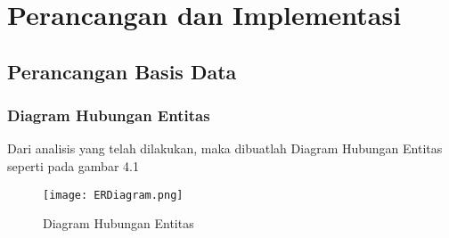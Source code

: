 \chapter{Perancangan dan Implementasi}
\label{chap:perancanganDanImplementasi}
\setcounter{secnumdepth}{3}
\section{Perancangan Basis Data}
\subsection{Diagram Hubungan Entitas}
Dari analisis yang telah dilakukan, maka dibuatlah Diagram Hubungan Entitas seperti pada gambar 4.1

\begin{figure} [H]
	\centering  
	\texttt{[image: ERDiagram.png]}  
	\caption[Diagram Hubungan Entitas]{Diagram Hubungan Entitas} 
	\label{fig:skematik-phpexcel} 
\end{figure}

